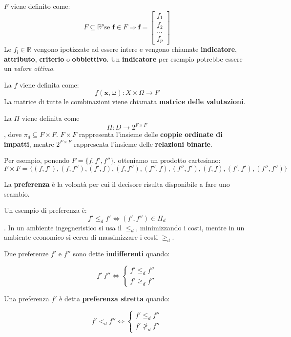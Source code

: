 \documentclass[\main/main.tex]{subfiles}
\begin{document}
$F$ viene definito come: \[F \subseteq \mathbb{R}^p \text{se } \bm{f} \in F \Rightarrow \bm{f} = \begin{bmatrix}f_1\\ f_2\\...\\ f_p \end{bmatrix}\]
Le $f_l \in \mathbb{R}$ vengono ipotizzate ad essere intere e vengono chiamate \textbf{indicatore}, \textbf{attributo}, \textbf{criterio} o \textbf{obbiettivo}. Un \textbf{indicatore} per esempio potrebbe essere un \textit{valore ottimo}.

La $f$ viene definita come: \[ f(\bm{x},\bm{\omega}): X\times\Omega \rightarrow F \]
La matrice di tutte le combinazioni viene chiamata \textbf{matrice delle valutazioni}.

La $\Pi$ viene definita come \[\Pi: D \rightarrow 2^{F\times F}\], dove $\pi_d \subseteq F\times F$. $F\times F$ rappresenta l'insieme delle \textbf{coppie ordinate di impatti}, mentre $2^{F \times F}$ rappresenta l'insieme delle \textbf{relazioni binarie}.

Per esempio, ponendo $F = \{f, f', f''\}$, otteniamo un prodotto cartesiano: \[F \times F = \{ (f,f'), (f,f''), (f', f), (f, f''), (f'', f), (f'', f'), (f, f), (f', f'), (f'', f'') \}\]

La \textbf{preferenza} è la volontà per cui il decisore risulta disponibile a fare uno scambio.

Un esempio di preferenza è: \[ f' \leq_d f' \Leftrightarrow (f', f'')\in \Pi_d \]. In un ambiente ingegneristico si usa il $\leq_d$, minimizzando i costi, mentre in un ambiente economico si cerca di massimizzare i costi $\geq_d$.

\begin{definition}[indifferenza]
Due preferenze $f'$ e $f''$ sono dette \textbf{indifferenti} quando:

\[
	f' ~ f'' \Leftrightarrow \begin{cases} f' \leq_d f'' \\ f' \geq_d f'' \end{cases}
\] 
\end{definition}

\begin{definition}
Una preferenza $f'$ è detta \textbf{preferenza stretta} quando:

\[
	f' <_d f'' \Leftrightarrow \begin{cases} f' \leq_d f'' \\ f' \ngeq_d f'' \end{cases}
\] 
\end{definition}
\end{document}
